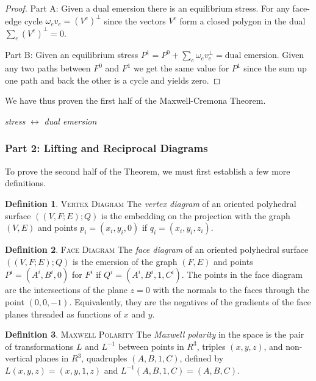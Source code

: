 \documentclass[11pt]{article}
\theoremstyle{definition}
\newtheorem{definition}{Definition}[section]
\begin{document}
	\begin{proof} 
		Part A: Given a dual emersion there is an equilibrium stress.
		For any face-edge cycle $\omega_e v_e = (V^e)^{\bot}$ since the vectors $V^e$ form a closed polygon in the dual $\sum_e(V^e)^\bot = 0$.

		Part B: Given an equilibrium stress $P^1 = P^0 + \sum_e \omega_ev_e^\bot = \text{dual emersion}$.
		Given any two paths between $F^0$ and $F^1$ we get the same value for $P^1$ since the sum up one path and back the other is a cycle and yields zero.
	\end{proof}
	
	We have thus proven the first half of the Maxwell-Cremona Theorem.

	\emph{stress} $\leftrightarrow$ \emph{dual emersion}

\subsubsection{Part 2: Lifting and Reciprocal Diagrams}

	To prove the second half of the Theorem, we must first establish a few more definitions.
	
	\theoremstyle{definition}
	\begin{definition}{\textsc{Vertex Diagram}}
		The \emph{vertex diagram} of an oriented polyhedral surface $((V,F;E);Q)$ is the embedding on the projection with the graph $(V,E)$ and points $p_i = (x_i,y_i,0)$ if $q_i = (x_i,y_i,z_i)$.
	\end{definition}
	
	\theoremstyle{definition}
	\begin{definition}{\textsc{Face Diagram}}
		The \emph{face diagram} of an oriented polyhedral surface $((V,F;E);Q)$ is the emersion of the graph $(F,E)$ and points $P^i = (A^i,B^i,0)$ for $F^i$ if $Q^i = (A^i,B^i,1,C^i)$. 
		The points in the face diagram are the intersections of the plane $z=0$ with the normals to the faces through the point $(0,0,-1)$. 
		Equivalently, they are the negatives of the gradients of the face planes threaded as functions of $x$ and $y$.
	\end{definition}
	
	\theoremstyle{definition}
 	\begin{definition}{\textsc{Maxwell Polarity}}
 		The \emph{Maxwell polarity} in the space is the pair of transformations $L$ and $L^{-1}$ between points in $R^3$, triples $(x,y,z)$, and non-vertical planes in $R^3$, quadruples $(A,B,1,C)$, defined by $L(x,y,z)=(x,y,1,z)$ and $L^{-1}(A,B,1,C) = (A,B,C)$.
 	\end{definition}
	
\end{document}
